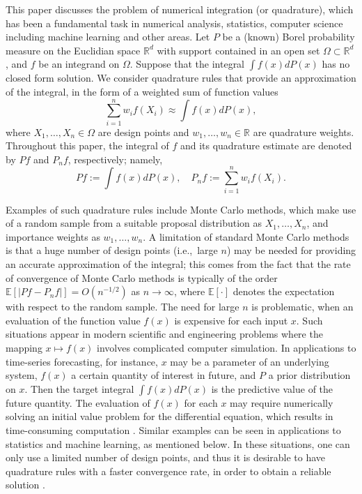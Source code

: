 \documentclass[11pt]{article}
\theoremstyle{remark}
\theoremstyle{example}
\theoremstyle{remark}
\newcommand{\R}{\mathbb{R}}
\newcommand{\citep}{\cite}
\begin{document}
This paper discusses the problem of numerical integration (or quadrature), which has been a fundamental task in numerical analysis, statistics, computer science including machine learning and other areas. Let $P$ be a (known) Borel probability measure on the Euclidian space $\R^d$ with support contained in an open set $\Omega \subset \R^d$, and $f$ be an integrand on $\Omega$. Suppose that the integral $\int f(x)dP(x)$ has no closed form solution.
We consider quadrature rules that provide an approximation of the integral, in the form of a weighted sum of function values
\begin{equation} \label{eq:intro_numint}
\sum_{i=1}^n w_i f(X_i) \approx \int f(x)dP(x),
\end{equation}
where $X_1,\dots,X_n \in \Omega$ are design points and  $w_1,\dots,w_n \in \R$ are quadrature weights.
Throughout this paper, the integral of $f$ and its quadrature estimate are denoted by $Pf$ and $P_nf$, respectively; namely,
\begin{equation} \label{eq:dist_notation}
Pf := \int f(x)dP(x), \quad P_n f := \sum_{i=1}^n w_i f(X_i). 
\end{equation} 

Examples of such quadrature rules include Monte Carlo methods, which make use of a random sample from a suitable proposal distribution as $X_1,\dots,X_n$, and importance weights as $w_1,\dots,w_n$.  
A limitation of standard Monte Carlo methods is that a huge number of design points (i.e.,~large $n$) may be needed for providing an accurate approximation of the integral; this comes from the fact that the rate of convergence of Monte Carlo methods is typically of the order $\mathbb{E}[|Pf- P_nf|] = O(n^{-1/2})$ as $n \to \infty$, where $\mathbb{E}[\cdot]$ denotes the expectation with respect to the random sample.
The need for large $n$ is problematic, when an evaluation of the function value $f(x)$ is expensive for each input $x$. 
Such situations appear in modern scientific and engineering problems where the mapping $x \mapsto f(x)$ involves complicated computer simulation.
In applications to time-series forecasting, for instance, $x$ may be a parameter of an underlying system, $f(x)$ a certain quantity of interest in future, and $P$ a prior distribution on $x$.
Then the target integral $\int f(x)dP(x)$ is the predictive value of the future quantity. 
The evaluation of $f(x)$ for each $x$ may require numerically solving an initial value problem for the differential equation, which results in time-consuming computation \citep{pmlr-v70-briol17a}.
Similar examples can be seen in applications to statistics and machine learning, as mentioned below.
In these situations, one can only use a limited number of design points, and thus it is desirable to have quadrature rules with a faster convergence rate, in order to obtain a reliable solution \citep{OatGirCho17}.
\end{document}
